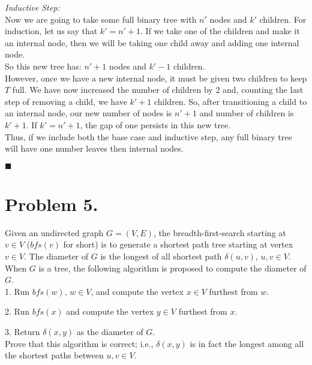 \documentclass[11pt]{article}
\begin{document}
\noindent
{\em Inductive Step: }\\
Now we are going to take some full binary tree with $n'$ nodes and $k'$ children. For induction, let us say that $k' = n'+1$. If we take one of the children and make it an internal node, then we will be taking one child away and adding one internal node. \\ 
So this new tree has: $n'+1$ nodes and $k'-1$ children. \\

However, once we have a new internal node, it must be given two children to keep $T$ full. We have now increased the number of children by 2 and, counting the last step of removing a child, we have $k'+1$ children. So, after transitioning a child to an internal node, our new number of nodes is $n'+1$ and number of children is $k'+1$. If $k' = n'+1$, the gap of one persists in this new tree.\\

Thus, if we include both the base case and inductive step, any full binary tree will have one number leaves then internal nodes. 

\begin{flushright}$\blacksquare$\end{flushright}


\newpage

\section*{Problem 5.}

Given an undirected graph $G=(V,E)$, the breadth-first-search starting at $v \in V$ ($bfs(v)$ for short) is to generate a shortest path tree starting at vertex $v \in V$. The diameter of $G$ is the longest of all shortest path $\delta (u,v)$, $u,v \in V$.\\

When $G$ is a tree, the following algorithm is proposed to compute the diameter of $G$.\\

1. Run $bfs(w)$, $w\in V$, and compute the vertex $x \in V$ furthest from $w$.

2. Run $bfs(x)$ and compute the vertex $y \in V$ furthest from $x$.

3. Return $\delta (x, y)$ as the diameter of $G$.\\

Prove that this algorithm is correct; i.e., $\delta (x,y)$ is in fact the longest among all the shortest paths between $u,v \in V$.\\
\end{document}
